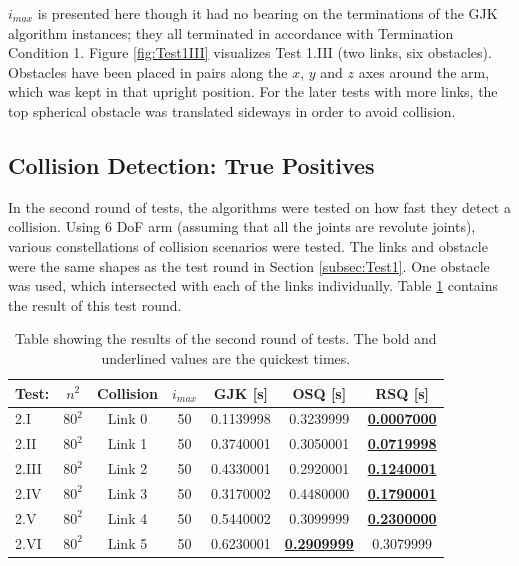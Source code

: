 $i_{max}$ is presented here though it had no bearing on the terminations of the \gls{GJK} algorithm instances; they all terminated in accordance with Termination Condition 1. Figure \ref{fig:Test1III} visualizes Test 1.III (two links, six obstacles). Obstacles have been placed in pairs along the $x$, $y$ and $z$ axes around the arm, which was kept in that upright position. For the later tests with more links, the top spherical obstacle was translated sideways in order to avoid collision.

\subsection{Collision Detection: True Positives}\label{subsec:Test2}

In the second round of tests, the algorithms were tested on how fast they detect a collision. Using  6 \gls{DoF} arm (assuming that all the joints are revolute joints), various constellations of collision scenarios were tested. The links and obstacle were the same shapes as the test round in Section \ref{subsec:Test1}. One obstacle was used, which intersected with each of the links individually. Table \ref{Table:2} contains the result of this test round.

\begin{table}[h]
	\centering
	\caption{Table showing the results of the second round of tests. The bold and underlined values are the quickest times.}
	\begin{tabular}{|l|c|c|c|c|c|c|}
		\hline
		Test: & $n^2$ & Collision & $i_{max}$ & \gls{GJK} [s] & O\gls{SQ} [s] & R\gls{SQ} [s]\\
		\hline
		2.I 	& $80^2$	&	Link 0	&	50	&	0.1139998	&	0.3239999   &	\underline{\textbf{0.0007000}}	\\
		2.II 	& $80^2$	&	Link 1	&	50	&	0.3740001	&	0.3050001   &	\underline{\textbf{0.0719998}}	\\
		2.III 	& $80^2$	&	Link 2	&	50	&	0.4330001	&	0.2920001   &	\underline{\textbf{0.1240001}}	\\
		2.IV 	& $80^2$	&	Link 3	&	50	&	0.3170002	&	0.4480000   &	\underline{\textbf{0.1790001}}	\\
		2.V 	& $80^2$	&	Link 4	&	50	&	0.5440002	&	0.3099999	&	\underline{\textbf{0.2300000}}	\\
		2.VI 	& $80^2$	&	Link 5	&	50	&	0.6230001	&	\underline{\textbf{0.2909999}}	&	0.3079999	\\
		\hline         
	\end{tabular}
	\label{Table:2}
\end{table}

